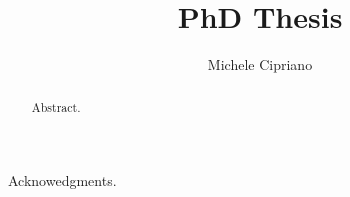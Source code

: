 \documentclass[oneside]{sapthesis}
\title{PhD Thesis}
\author{Michele Cipriano}
\begin{document}
\frontmatter

\maketitle

\dedication{Dedication.}

\begin{acknowledgments}
Acknowedgments.
\end{acknowledgments}

\begin{abstract}
Abstract.
\end{abstract}

\tableofcontents

\mainmatter




\backmatter
\cleardoublepage
{}

\end{document}

